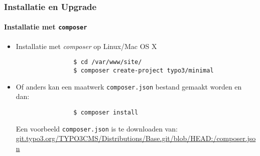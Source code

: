 \begin{frame}[fragile]
	\frametitle{Installatie en Upgrade}
	\framesubtitle{Installatie met \texttt{composer}}

	\begin{itemize}
		\item Installatie met \textit{composer} op Linux/Mac OS X

			\begin{lstlisting}
				$ cd /var/www/site/
				$ composer create-project typo3/minimal
			\end{lstlisting}

		\item Of anders kan een maatwerk \texttt{composer.json} bestand gemaakt worden en dan:

			\begin{lstlisting}
				$ composer install
			\end{lstlisting}

			Een voorbeeld \texttt{composer.json} is te downloaden van:\newline
			\small
				\href{https://git.typo3.org/TYPO3CMS/Distributions/Base.git/blob/HEAD:/composer.json}{git.typo3.org/TYPO3CMS/Distributions/Base.git/blob/HEAD:/composer.json}
			\normalsize

	\end{itemize}
\end{frame}

